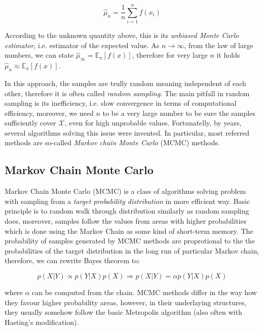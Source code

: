 \documentclass[
  digital, %
  table,   %
  twoside, %
  12pt,
  lof,     %
  lot,     %
]{fithesis3}
\begin{document}
\begin{equation}
\hat{\mu}_n = \frac{1}{n} \sum_{i=1}^{n} f \left( x_i \right)
\end{equation}

According to the unknown quantity above, this 
is its \textit{unbiased Monte Carlo estimator}, i.e. 
estimator of the expected value. 
As $n \to \infty$, from the law of large numbers, 
we can state 
$\hat{\mu}_{\infty} = \mathbb{E}_{\pi}\left[ f(x) \right]$, 
therefore for very large $n$ it holds 
$\hat{\mu}_n \approx \mathbb{E}_{\pi}\left[ f(x) \right]$.

In this approach, the samples are trully 
random meaning independent of each other, 
therefore it is often called 
\textit{random sampling}. 
The main pitfall in random sampling is its 
inefficiency, i.e. slow convergence in terms 
of computational efficiency, moreover, we 
need $n$ to be a very large number to be 
sure the samples sufficiently cover 
$\mathcal{X}$, even for high unprobable values. 
Fortunatelly, by years, several algorithms 
solving this issue were invented. 
In particular, most referred methods are 
so-called \textit{Markov chain Monte Carlo} (MCMC) 
methods.


\subsection{Markov Chain Monte Carlo}

Markov Chain Monte Carlo (MCMC) is a class of 
algorithms solving problem with sampling from a 
\textit{target probability distribution} in more 
efficient way. 
Basic principle is to random walk through 
distribution similarly as random sampling 
does, moreover, samples follow the values 
from areas with higher probabilities which is 
done using the Markov Chain as some kind 
of short-term memory. 
The probability of samples generated by 
MCMC methods are proprotional to the the 
probabilities of the target distribution in 
the long run of particular Markov chain, 
therefore, we can rewrite Bayes theorem to:

\begin{equation}
p( X | Y ) \propto p( Y | X ) p(X) \Rightarrow p( X | Y ) = \alpha p( Y | X ) p(X)
\end{equation}

where $\alpha$ can be computed from the chain. 
MCMC methods differ in the way how they favour 
higher probability areas, however, in their 
underlaying structures, they usually somehow 
follow the basic Metropolis algorithm (also 
often with Hasting's modification).
\end{document}
